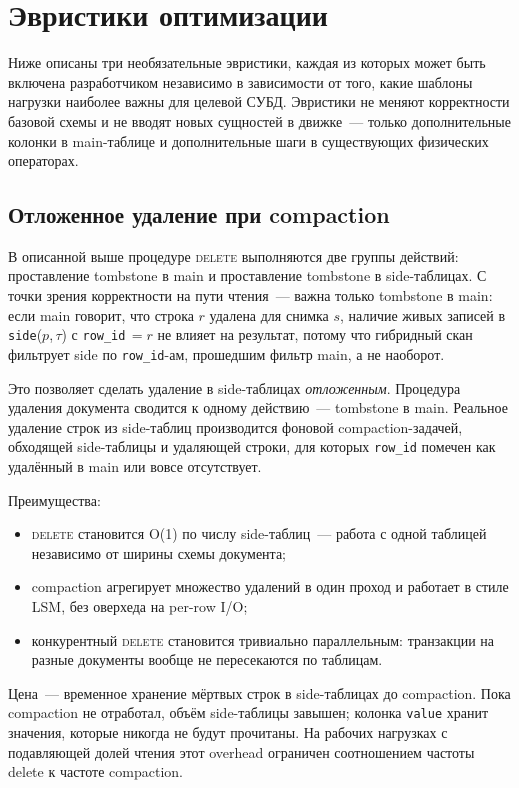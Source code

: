\documentclass[conference,a4paper,10pt]{IEEEtran}
\begin{document}
\section{Эвристики оптимизации}
\label{sec:heuristics}

Ниже описаны три необязательные эвристики, каждая из которых может
быть включена разработчиком независимо в зависимости от того, какие
шаблоны нагрузки наиболее важны для целевой СУБД. Эвристики не
меняют корректности базовой схемы и не вводят новых сущностей в
движке~--- только дополнительные колонки в main-таблице и
дополнительные шаги в существующих физических операторах.

\subsection{Отложенное удаление при compaction}

В описанной выше процедуре \textsc{delete} выполняются две группы
действий: проставление tombstone в main и проставление tombstone в
side-таблицах. С точки зрения корректности на пути чтения~---
важна только tombstone в main: если main говорит, что строка
$r$ удалена для снимка $s$, наличие живых записей в
\texttt{side}($p$,\,$\tau$) с \texttt{row\_id}\,$=r$ не влияет на
результат, потому что
гибридный скан фильтрует side по \texttt{row\_id}-ам, прошедшим
фильтр main, а не наоборот.

Это позволяет сделать удаление в side-таблицах \emph{отложенным}.
Процедура удаления документа сводится к одному действию~---
tombstone в main. Реальное удаление строк из side-таблиц
производится фоновой compaction-задачей, обходящей side-таблицы
и удаляющей строки, для которых \texttt{row\_id} помечен как
удалённый в main или вовсе отсутствует.

Преимущества:
\begin{itemize}
  \item \textsc{delete} становится O(1) по числу
        side-таблиц~--- работа с одной таблицей независимо от
        ширины схемы документа;
  \item compaction агрегирует множество удалений в один проход и
        работает в стиле LSM, без оверхеда на per-row I/O;
  \item конкурентный \textsc{delete} становится тривиально
        параллельным: транзакции на разные документы вообще не
        пересекаются по таблицам.
\end{itemize}

Цена~--- временное хранение мёртвых строк в side-таблицах до
compaction. Пока compaction не отработал, объём side-таблицы
завышен; колонка \texttt{value} хранит значения, которые никогда
не будут прочитаны. На рабочих нагрузках с подавляющей долей чтения
этот overhead ограничен соотношением частоты delete к частоте
compaction.
\end{document}
